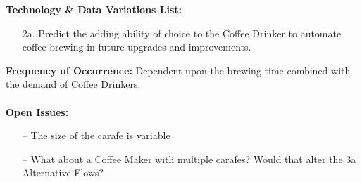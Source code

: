 \documentclass[letterpaper]{article}
\begin{document}
\textbf{Technology \& Data Variations List: }
\begin{itemize}
\item[2a.] Predict the adding ability of choice to the Coffee Drinker
to automate coffee brewing in future upgrades and improvements.
\end{itemize}
\textbf{Frequency of Occurrence: } Dependent upon the brewing time
combined with the demand of Coffee Drinkers.\\\\
\textbf{Open Issues: }
\begin{itemize}
\item[--]The size of the carafe is variable
\item[--]What about a Coffee Maker with multiple carafes?  Would that
alter the 3a Alternative Flows?
\end{itemize}
\end{document}
